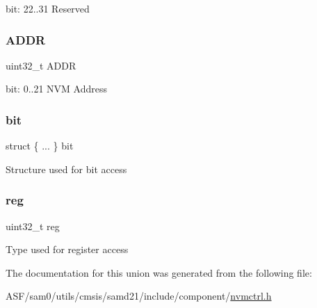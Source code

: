 bit\+: 22..31 Reserved \mbox{\label{union_n_v_m_c_t_r_l___a_d_d_r___type_ac9f49eaa00ec245d66e5342c02bcce9f}} 
\subsubsection{\texorpdfstring{ADDR}{ADDR}}
{\footnotesize\ttfamily uint32\+\_\+t A\+D\+DR}

bit\+: 0..21 N\+VM Address \mbox{\label{union_n_v_m_c_t_r_l___a_d_d_r___type_a56b8b654a7eafc78561f7127a140b7b0}} 
\subsubsection{\texorpdfstring{bit}{bit}}
{\footnotesize\ttfamily struct \{ ... \}   bit}

Structure used for bit access \mbox{\label{union_n_v_m_c_t_r_l___a_d_d_r___type_a6b91636401516a477989a336376d7b40}} 
\subsubsection{\texorpdfstring{reg}{reg}}
{\footnotesize\ttfamily uint32\+\_\+t reg}

Type used for register access 

The documentation for this union was generated from the following file\+:\begin{DoxyCompactItemize}
\item 
A\+S\+F/sam0/utils/cmsis/samd21/include/component/\mbox{\hyperlink{component_2nvmctrl_8h}{nvmctrl.\+h}}\end{DoxyCompactItemize}
